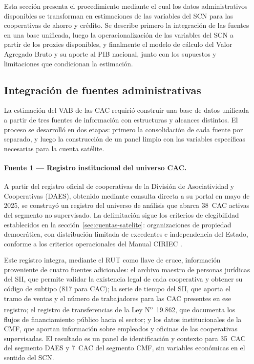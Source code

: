 Esta sección presenta el procedimiento mediante el cual los datos administrativos disponibles se transforman en estimaciones de las variables del SCN para las cooperativas de ahorro y crédito. Se describe primero la integración de las fuentes en una base unificada, luego la operacionalización de las variables del SCN a partir de los proxies disponibles, y finalmente el modelo de cálculo del Valor Agregado Bruto y su aporte al PIB nacional, junto con los supuestos y limitaciones que condicionan la estimación.


\subsection{Integración de fuentes administrativas}
\label{subsec:integracion-fuentes}

La estimación del VAB de las CAC requirió construir una base
de datos unificada a partir de tres fuentes de información
con estructuras y alcances distintos. El proceso se desarrolló
en dos etapas: primero la consolidación de cada fuente por
separado, y luego la construcción de un panel limpio con las
variables específicas necesarias para la cuenta satélite.

\paragraph{Fuente 1 — Registro institucional del universo CAC.}

A partir del registro oficial de cooperativas de la División
de Asociatividad y Cooperativas (DAES), obtenido mediante
consulta directa a su portal en mayo de 2025, se construyó
un registro del universo de análisis que abarca 38~CAC
activas del segmento no supervisado. La delimitación sigue
los criterios de elegibilidad establecidos en la
sección~\ref{sec:cuentas-satelite}: organizaciones de
propiedad democrática, con distribución limitada de
excedentes e independencia del Estado, conforme a los
criterios operacionales del Manual CIRIEC
\cite{barea_tejeiro_manual_2007}.

Este registro integra, mediante el RUT como llave de cruce,
información proveniente de cuatro fuentes adicionales: el
archivo maestro de personas jurídicas del SII, que permite
validar la existencia legal de cada cooperativa y obtener su
código de subtipo (817 para CAC); la serie de tiempo del SII,
que aporta el tramo de ventas y el número de trabajadores
para las CAC presentes en ese registro; el registro de
transferencias de la Ley N\textsuperscript{o}~19.862, que
documenta los flujos de financiamiento público hacia el
sector; y los datos institucionales de la CMF, que aportan
información sobre empleados y oficinas de las cooperativas
supervisadas. El resultado es un panel de identificación y
contexto para 35~CAC del segmento DAES y 7~CAC del segmento
CMF, sin variables económicas en el sentido del SCN.

